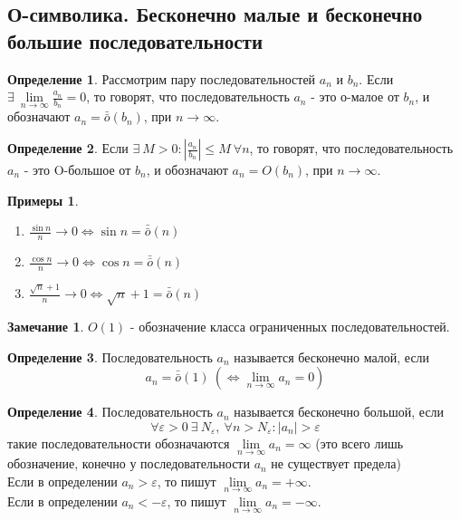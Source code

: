 \documentclass[a4paper, 12pt]{article}
\renewcommand{\epsilon}{\varepsilon}
\newcommand\tab[1][.5cm]{\hspace*{#1}}
\newcommand{\lims}{\lim\limits_{n\to \infty}}
\newcommand{\om}{\bar{\bar{o}}}
\theoremstyle{definition}
\newtheorem*{definition}{Определение}
\newtheorem*{comm}{Замечание}
\newtheorem*{examples}{Примеры}
\begin{document}
        \subsection{О-символика. Бесконечно малые и бесконечно большие последовательности}
        \begin{definition}
            Рассмотрим пару последовательностей $a_n$ и $b_n$. Если\\ $\exists\ \lims \frac{a_n}{b_n}=0$, то говорят, что последовательность $a_n$ - это о-малое от $b_n$, и обозначают $a_n=\om(b_n)$, при $n\to \infty$. 
        \end{definition} 
        \begin{definition}
            Если $\exists\ M>0: |\frac{a_n}{b_n}|\leq M\ \forall n$, то говорят, что последовательность $a_n$ - это O-большое от $b_n$, и обозначают $a_n=O(b_n)$, при $n\to \infty$.
        \end{definition} 
        \begin{examples}\tab
            \begin{enumerate}
                \item $\frac{\sin n}{n}\to 0 \Leftrightarrow \sin n = \om(n)$
                \item $\frac{\cos n}{n}\to 0 \Leftrightarrow \cos n = \om(n)$
                \item $\frac{\sqrt{n}+1}{n}\to 0 \Leftrightarrow \sqrt{n}+1 = \om(n)$
            \end{enumerate}
        \end{examples}
        \begin{comm}
            $O(1)$ - обозначение класса ограниченных последовательностей.
        \end{comm} 
        \begin{definition}
            Последовательность $a_n$ называется бесконечно малой, если 
            \[a_n=\om(1)\ (\Leftrightarrow \lim\limits_{n\to \infty}a_n=0)\]
        \end{definition} 
        \begin{definition}
            Последовательность $a_n$ называется бесконечно большой, если 
            \[\forall \epsilon>0\ \exists\ N_{\epsilon},\ \forall n>N_{\epsilon}: |a_n|>\epsilon\] 
            такие последовательности обозначаются $\lims a_n=\infty$ (это всего лишь обозначение, конечно у последовательности $a_n$ не существует предела)\\
            Если в определении $a_n>\epsilon$, то пишут $\lims a_n=+\infty$.\\
            Если в определении $a_n<-\epsilon$, то пишут $\lims a_n=-\infty$.
        \end{definition} 
\end{document}
